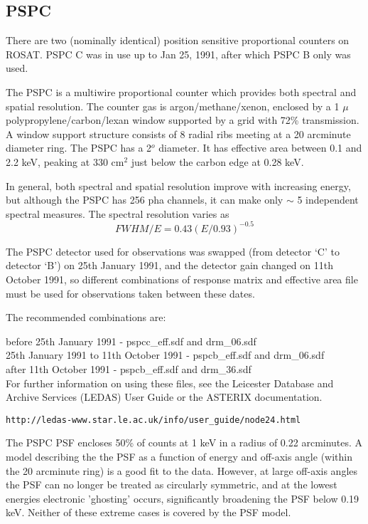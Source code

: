 \documentclass[11pt,fleqn]{article}    %
\begin{document}
\subsection{PSPC}
There are two (nominally identical) position sensitive proportional
counters on ROSAT. PSPC C was in use up to Jan 25, 1991, after which PSPC
B only was used.

The PSPC is a multiwire proportional counter which provides both spectral
and spatial resolution. The counter gas is argon/methane/xenon, enclosed
by a 1 $\mu$ polypropylene/carbon/lexan window supported by a 
grid  with 72\% transmission. A window support structure consists of 8 
radial ribs meeting at a 20 arcminute diameter ring. The PSPC has a 2$^o$
diameter. It has effective area between 0.1 and 2.2 keV, peaking at 330
cm$^2$ just below the carbon edge at 0.28 keV.

In general, both spectral and spatial resolution improve with increasing
energy, but although the PSPC has 256 pha channels, it can make only
$\sim$ 5 independent spectral measures. The spectral resolution varies as
$$ FWHM/E = 0.43 (E/0.93)^{-0.5}$$

The PSPC detector used for observations was swapped (from detector `C' to
detector `B') on 25th January 1991, and the detector gain changed on
11th October 1991, so different combinations of response matrix and
effective area file must be used for observations taken between these dates.

The recommended combinations are: 

before 25th January 1991 - pspcc\_eff.sdf and drm\_06.sdf \\
25th January 1991 to 11th October 1991 - pspcb\_eff.sdf and drm\_06.sdf \\
after 11th October 1991 - pspcb\_eff.sdf and drm\_36.sdf \\

For further information on using these files, see the Leicester Database
and Archive Services (LEDAS) User Guide or the ASTERIX documentation. 

\begin{verbatim}
http://ledas-www.star.le.ac.uk/info/user_guide/node24.html
\end{verbatim}


The PSPC PSF encloses 50\% of counts at 1 keV in a radius of 0.22
arcminutes. A model describing the the PSF as a function of energy and
off-axis angle (within the 20 arcminute ring) is a good fit to the data.
However, at large off-axis angles the PSF can no longer be treated as
circularly symmetric, and at the lowest energies electronic 'ghosting'
occurs, significantly broadening the PSF below 0.19 keV. Neither of these
extreme cases is covered by the PSF model.
\end{document}
